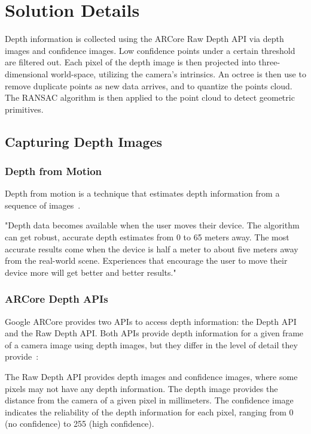 \chapter{Solution Details}

Depth information is collected using the ARCore Raw Depth API via depth images and confidence images.
Low confidence points under a certain threshold are filtered out.
Each pixel of the depth image is then projected into three-dimensional world-space, utilizing the camera's intrinsics.
An octree is then use to remove duplicate points as new data arrives, and to quantize the points cloud.
The RANSAC algorithm is then applied to the point cloud to detect geometric primitives.


\section{Capturing Depth Images}

\subsection{Depth from Motion}
Depth from motion is a technique that estimates depth information from a sequence of images~\parencite{valentin_depth_2018}.

"Depth data becomes available when the user moves their device. The algorithm can get robust, accurate depth estimates from 0 to 65 meters away. The most accurate results come when the device is half a meter to about five meters away from the real-world scene. Experiences that encourage the user to move their device more will get better and better results."
\parencite{google_llc_arcore_doc}

\subsection{ARCore Depth APIs}
Google ARCore provides two APIs to access depth information: the Depth API and the Raw Depth API\@.
Both APIs provide depth information for a given frame of a camera image using depth images, but they differ in the level of detail they provide~\parencite{google_llc_arcore_doc}:

The Raw Depth API provides depth images and confidence images, where some pixels may not have any depth information.
The depth image provides the distance from the camera of a given pixel in millimeters.
The confidence image indicates the reliability of the depth information for each pixel, ranging from 0 (no confidence) to 255 (high confidence).

